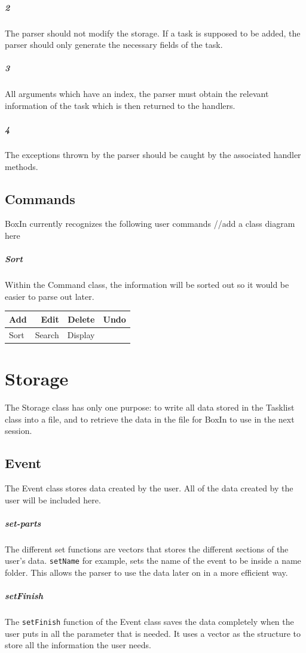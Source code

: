 \documentclass[12pt]{extarticle}
\begin{document}
\subparagraph{2} The parser should not modify the storage. If a task is supposed to be added, the parser should only generate the necessary fields of the task.

\subparagraph{3} All arguments which have an index, the parser must obtain the relevant information of the task which is then returned to the handlers.

\subparagraph{4} The exceptions thrown by the parser should be caught by the associated handler methods.

\subsection{Commands}
BoxIn currently recognizes the following user commands
//add a class diagram here 
\subparagraph{Sort}
Within the Command class, the information will be sorted out so it would be easier to parse out later.

\begin{center}
\begin{tabular}{  lrrl}
\hline
Add & Edit & Delete & Undo \\
\hline
Sort & Search & Display\\
\hline     
\end{tabular}
\end{center}

\newpage

\section{Storage}
The Storage class has only one purpose: to write all data stored in the Tasklist class into a file, and to retrieve the data in the file for BoxIn to use in the next session. 

\subsection{Event}	 					
The Event class stores data created by the user. All of the data created by the user will be included here.
\subparagraph{set-parts}
The different set functions are vectors that stores the different sections of the user's data. \texttt{setName} for example, sets the name of the event to be inside a name folder. This allows the parser to use the data later on in a more efficient way.
\subparagraph{setFinish}
The \texttt{setFinish} function of the Event class saves the data completely when the user puts in all the parameter that is needed. It uses a vector as the structure to store all the information the user needs. 
\end{document}
